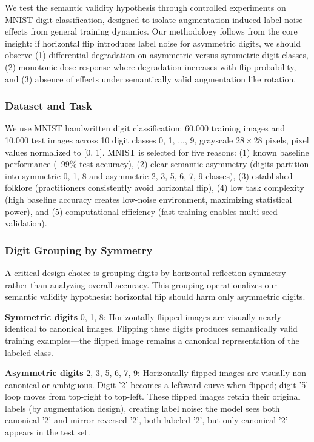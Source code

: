 
We test the semantic validity hypothesis through controlled experiments on MNIST digit classification, designed to isolate augmentation-induced label noise effects from general training dynamics. Our methodology follows from the core insight: if horizontal flip introduces label noise for asymmetric digits, we should observe (1) differential degradation on asymmetric versus symmetric digit classes, (2) monotonic dose-response where degradation increases with flip probability, and (3) absence of effects under semantically valid augmentation like rotation.

\subsubsection{Dataset and Task}

We use MNIST handwritten digit classification: 60,000 training images and 10,000 test images across 10 digit classes {0, 1, ..., 9}, grayscale $28\times 28$ pixels, pixel values normalized to [0, 1]. MNIST is selected for five reasons: (1) known baseline performance (~99\% test accuracy), (2) clear semantic asymmetry (digits partition into symmetric {0, 1, 8} and asymmetric {2, 3, 5, 6, 7, 9} classes), (3) established folklore (practitioners consistently avoid horizontal flip), (4) low task complexity (high baseline accuracy creates low-noise environment, maximizing statistical power), and (5) computational efficiency (fast training enables multi-seed validation).

\subsubsection{Digit Grouping by Symmetry}

A critical design choice is grouping digits by horizontal reflection symmetry rather than analyzing overall accuracy. This grouping operationalizes our semantic validity hypothesis: horizontal flip should harm only asymmetric digits.

\textbf{Symmetric digits} {0, 1, 8}: Horizontally flipped images are visually nearly identical to canonical images. Flipping these digits produces semantically valid training examples---the flipped image remains a canonical representation of the labeled class.

\textbf{Asymmetric digits} {2, 3, 5, 6, 7, 9}: Horizontally flipped images are visually non-canonical or ambiguous. Digit '2' becomes a leftward curve when flipped; digit '5' loop moves from top-right to top-left. These flipped images retain their original labels (by augmentation design), creating label noise: the model sees both canonical '2' and mirror-reversed '2', both labeled '2', but only canonical '2' appears in the test set.

